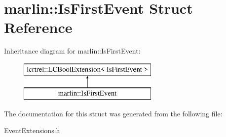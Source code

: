 \section{marlin\+:\+:Is\+First\+Event Struct Reference}
\label{structmarlin_1_1IsFirstEvent}
Inheritance diagram for marlin\+:\+:Is\+First\+Event\+:\begin{figure}[H]
\begin{center}
\leavevmode
\includegraphics[height=2.000000cm]{structmarlin_1_1IsFirstEvent}
\end{center}
\end{figure}


The documentation for this struct was generated from the following file\+:\begin{DoxyCompactItemize}
\item 
Event\+Extensions.\+h\end{DoxyCompactItemize}
